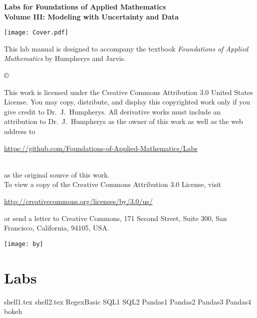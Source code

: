 \documentclass[nociteref]{SIAM-GH-book}
\begin{document}

\thispagestyle{empty} %

\begin{center}
{\huge \bf Labs for Foundations of Applied Mathematics} \\
\vspace{5mm}
{\Large \bf Volume III: Modeling with Uncertainty and Data}
\vspace{20mm}

\texttt{[image: Cover.pdf]}
\end{center}
\frontmatter



\begin{thepreface} %

This lab manual is designed to accompany the textbook \emph{Foundations of Applied Mathematics} by Humpherys and Jarvis.

\vfill
\copyright{This work is licensed under the Creative Commons Attribution 3.0 United States
License.  You may copy, distribute, and display this copyrighted work only if you give
credit to Dr.~J.~Humpherys. All derivative works must include an attribution to Dr.~J.~Humpherys as the owner of this work as well as the web address to
\\\centerline{\url{https://github.com/Foundations-of-Applied-Mathematics/Labs}}\\as the original source of this work.
\\To view a copy of the Creative Commons Attribution 3.0 License, visit
\\\centerline{\url{http://creativecommons.org/licenses/by/3.0/us/}} or send a letter to Creative Commons, 171 Second Street, Suite 300, San Francisco, California, 94105, USA.}

\vfill
\centering\texttt{[image: by]}
\vfill
\end{thepreface}

\setcounter{tocdepth}{1}
\tableofcontents

\mainmatter %

\part{Labs} %
{shell1.tex}
{shell2.tex}
{RegexBasic}
{SQL1}
{SQL2}
{Pandas1}
{Pandas2}
{Pandas3}
{Pandas4}
{bokeh}
\end{document}
